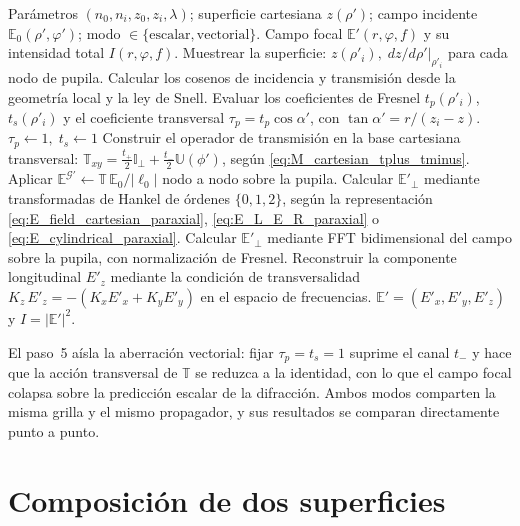 \begin{algorithm}[!htbp]
\caption{Campo focal tras un dioptrio estigmático}
\label{alg:single_diopter}
\small
\begin{algorithmic}[1]
\Require Parámetros $(n_0,n_i,z_0,z_i,\lambda)$; superficie cartesiana
$z(\rho')$; campo incidente $\mathbb E_0(\rho',\varphi')$; modo
$\in\{\text{escalar},\text{vectorial}\}$.
\Ensure Campo focal $\mathbb E'(r,\varphi,f)$ y su intensidad total
$I(r,\varphi,f)$.
\State Muestrear la superficie: $z(\rho'_i),\;dz/d\rho'|_{\rho'_i}$
para cada nodo de pupila.
\State Calcular los cosenos de incidencia y transmisión desde la geometría
local y la ley de Snell.
\State Evaluar los coeficientes de Fresnel $t_p(\rho'_i)$, $t_s(\rho'_i)$ y el
coeficiente transversal $\tau_p=t_p\cos\alpha'$, con
$\tan\alpha'=r/(z_i-z)$.
  \State $\tau_p\gets 1,\;t_s\gets 1$ 
\EndIf
\State Construir el operador de transmisión en la base cartesiana
transversal:
$\mathbb T_{xy}=\tfrac{t_+}{2}\mathbb I_\perp+\tfrac{t_-}{2}\mathbb U(\phi')$,
según \eqref{eq:M_cartesian_tplus_tminus}.
\State Aplicar $\mathbb E^{\mathscr G'}\gets\mathbb T\,\mathbb E_0/|\ell_0|$ nodo a
nodo sobre la pupila.
  \State Calcular $\mathbb E'_\perp$ mediante transformadas de Hankel de
  órdenes $\{0,1,2\}$, según la representación
  \eqref{eq:E_field_cartesian_paraxial}, \eqref{eq:E_L_E_R_paraxial} o
  \eqref{eq:E_cylindrical_paraxial}.
\Else
  \State Calcular $\mathbb E'_\perp$ mediante FFT bidimensional del campo
  sobre la pupila, con normalización de Fresnel.
\EndIf
\State Reconstruir la componente longitudinal $E'_z$ mediante la condición
de transversalidad
$K_z\,E'_z=-(K_x E'_x+K_y E'_y)$ en el espacio de frecuencias.
\State \Return $\mathbb E'=(E'_x,E'_y,E'_z)$ y $I=|\mathbb E'|^2$.
\end{algorithmic}
\end{algorithm}

El paso~5 aísla la aberración vectorial: fijar $\tau_p=t_s=1$ suprime el
canal $t_-$ y hace que la acción transversal de $\mathbb T$ se reduzca a la
identidad, con lo que el
campo focal colapsa sobre la predicción escalar de la difracción. Ambos
modos comparten la misma grilla y el mismo propagador, y sus resultados se
comparan directamente punto a punto.

\section{Composición de dos superficies}

